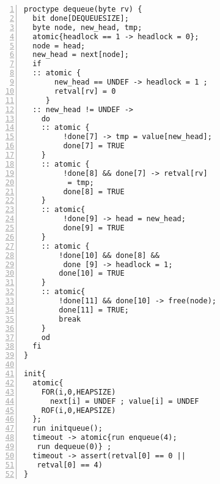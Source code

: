 \begin{Verbatim}[numbers=left]
proctype dequeue(byte rv) {
  bit done[DEQUEUESIZE];
  byte node, new_head, tmp;
  atomic{headlock == 1 -> headlock = 0};
  node = head;
  new_head = next[node];
  if
  :: atomic {
       new_head == UNDEF -> headlock = 1 ;
       retval[rv] = 0
     }
  :: new_head != UNDEF ->
    do
    :: atomic {
         !done[7] -> tmp = value[new_head];
         done[7] = TRUE
    }
    :: atomic {
         !done[8] && done[7] -> retval[rv]
          = tmp;
         done[8] = TRUE
    }
    :: atomic{
         !done[9] -> head = new_head;
         done[9] = TRUE
    }
    :: atomic {
        !done[10] && done[8] &&
         done [9] -> headlock = 1;
        done[10] = TRUE
    }
    :: atomic{
        !done[11] && done[10] -> free(node);
        done[11] = TRUE;
        break
    }
    od
  fi
}

init{
  atomic{
    FOR(i,0,HEAPSIZE)
      next[i] = UNDEF ; value[i] = UNDEF
    ROF(i,0,HEAPSIZE)
  };
  run initqueue();
  timeout -> atomic{run enqueue(4);
   run dequeue(0)} ;
  timeout -> assert(retval[0] == 0 ||
   retval[0] == 4)
}    
\end{Verbatim}